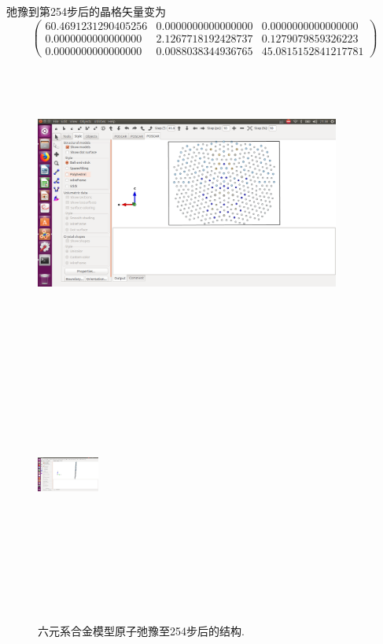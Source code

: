 \documentclass[10pt,a4paper]{article}
\begin{document}
\newpage
弛豫到第254步后的晶格矢量变为
\begin{displaymath}
	\begin{pmatrix}
		60.4691231290405256  & 0.0000000000000000   & 0.0000000000000000 \\
     0.0000000000000000   & 2.1267718192428737  &  0.1279079859326223 \\
     0.0000000000000000   & 0.0088038344936765  & 45.0815152841217781
	\end{pmatrix}
\end{displaymath}
\begin{figure}[h!]
\centering
\includegraphics[height=3.55in,width=3.95in,viewport=580 120 1130 690,clip]{Ni3Al_fin-1.png}
\hspace{0.1in}
\includegraphics[height=3.55in,width=0.8in,viewport=800 120 920 690,clip]{Ni3Al_fin-2.png}
\caption{\small 六元系合金模型原子弛豫至254步后的结构.}%
\label{Ni:Ni3Al_fin}
\end{figure}
\end{document}
